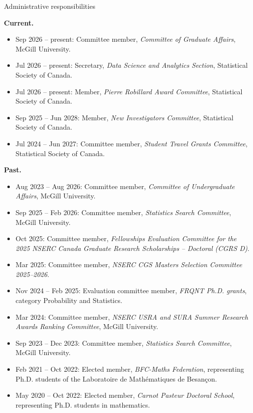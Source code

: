 \documentclass{resume}
\begin{document}
\begin{rSection}{Administrative responsibilities}
\vspace{2mm}

\textbf{Current.}
\begin{itemize}
  \item[--] Sep 2026 -- present: Committee member, \emph{Committee of Graduate Affairs}, McGill University.
  \item[--] Jul 2026 -- present: Secretary, \emph{Data Science and Analytics Section}, Statistical Society of Canada.
  \item[--] Jul 2026 -- present: Member, \emph{Pierre Robillard Award Committee}, Statistical Society of Canada.
  \item[--] Sep 2025 -- Jun 2028: Member, \emph{New Investigators Committee}, Statistical Society of Canada.
  \item[--] Jul 2024 -- Jun 2027: Committee member, \emph{Student Travel Grants Committee}, Statistical Society of Canada.
\end{itemize}

\textbf{Past.}
\begin{itemize}
  \item[--] Aug 2023 -- Aug 2026: Committee member, \emph{Committee of Undergraduate Affairs}, McGill University.
  \item[--] Sep 2025 -- Feb 2026: Committee member, \emph{Statistics Search Committee}, McGill University.
  \item[--] Oct 2025: Committee member, \emph{Fellowships Evaluation Committee for the 2025 NSERC Canada Graduate Research Scholarships -- Doctoral (CGRS D)}.
  \item[--] Mar 2025: Committee member, \emph{NSERC CGS Masters Selection Committee 2025--2026}.
  \item[--] Nov 2024 -- Feb 2025: Evaluation committee member, \emph{FRQNT Ph.D. grants}, category Probability and Statistics.
  \item[--] Mar 2024: Committee member, \emph{NSERC USRA and SURA Summer Research Awards Ranking Committee}, McGill University.
  \item[--] Sep 2023 -- Dec 2023: Committee member, \emph{Statistics Search Committee}, McGill University.
  \item[--] Feb 2021 -- Oct 2022: Elected member, \emph{BFC-Maths Federation}, representing Ph.D. students of the Laboratoire de Mathématiques de Besançon.
  \item[--] May 2020 -- Oct 2022: Elected member, \emph{Carnot Pasteur Doctoral School}, representing Ph.D. students in mathematics.
\end{itemize}
\end{rSection}
\end{document}
